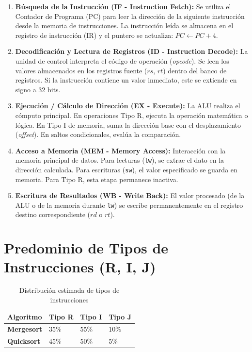 \documentclass[12pt,a4paper]{article}
\begin{document}
	\begin{enumerate}
		\item \textbf{Búsqueda de la Instrucción (IF - Instruction Fetch):} Se utiliza el Contador de Programa (PC) para leer la dirección de la siguiente instrucción desde la memoria de instrucciones. La instrucción leída se almacena en el registro de instrucción (IR) y el puntero se actualiza: $PC \leftarrow PC + 4$.
		\item \textbf{Decodificación y Lectura de Registros (ID - Instruction Decode):} La unidad de control interpreta el código de operación (\textit{opcode}). Se leen los valores almacenados en los registros fuente ($rs$, $rt$) dentro del banco de registros. Si la instrucción contiene un valor inmediato, este se extiende en signo a 32 bits.
		\item \textbf{Ejecución / Cálculo de Dirección (EX - Execute):} La ALU realiza el cómputo principal. En operaciones Tipo R, ejecuta la operación matemática o lógica. En Tipo I de memoria, suma la dirección base con el desplazamiento (\textit{offset}). En saltos condicionales, evalúa la comparación.
		\item \textbf{Acceso a Memoria (MEM - Memory Access):} Interacción con la memoria principal de datos. Para lecturas (\texttt{lw}), se extrae el dato en la dirección calculada. Para escrituras (\texttt{sw}), el valor especificado se guarda en memoria. Para Tipo R, esta etapa permanece inactiva.
		\item \textbf{Escritura de Resultados (WB - Write Back):} El valor procesado (de la ALU o de la memoria durante \texttt{lw}) se escribe permanentemente en el registro destino correspondiente ($rd$ o $rt$).
	\end{enumerate}
	
	
	\section{Predominio de Tipos de Instrucciones (R, I, J)}
	
	\begin{table}[h!]
		\centering
		\caption{Distribución estimada de tipos de instrucciones}
		\vspace{0.2cm}
		\begin{tabular}{l|l|l|l}
			\toprule
			\textbf{Algoritmo} & \textbf{Tipo R} & \textbf{Tipo I} & \textbf{Tipo J} \\
			\midrule
			\textbf{Mergesort} & 35\% & 55\% & 10\% \\
			\textbf{Quicksort} & 45\% & 50\% & 5\% \\
			\bottomrule
		\end{tabular}
	\end{table}
	
\end{document}
